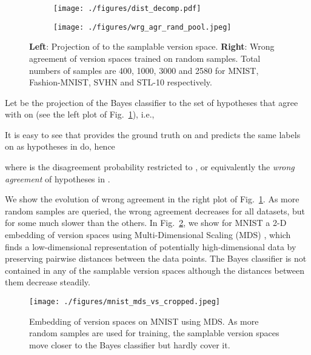 \documentclass[runningheads, envcountsame, a4paper]{llncs}
\newcommand{\ie}{i.e.}
\begin{document}
\begin{figure}[t!]
\begin{subfigure}{0.45\textwidth}
    \center
    \texttt{[image: ./figures/dist\_decomp.pdf]}
\end{subfigure}\begin{subfigure}{0.55\textwidth}
    \centering
    \texttt{[image: ./figures/wrg\_agr\_rand\_pool.jpeg]}
\end{subfigure}
\caption{\textbf{Left}: Projection of  to the samplable version space. \textbf{Right}: Wrong agreement of version spaces trained on random samples. Total numbers of samples are 400, 1000, 3000 and 2580 for MNIST, Fashion-MNIST, SVHN and STL-10 respectively.}
\label{fig:dist_decomp_wrg_agr}
\end{figure}

Let  be the projection of the Bayes classifier  to the set of hypotheses  that agree with  on  (see the left plot of Fig.~\ref{fig:dist_decomp_wrg_agr}), \ie,

It is easy to see that   provides the ground truth on  and predicts the same labels on  as hypotheses in  do, hence 

where  is the disagreement probability restricted to , or equivalently the \textit{wrong agreement} of hypotheses in . 

We show the evolution of wrong agreement in the right plot of Fig.~\ref{fig:dist_decomp_wrg_agr}. As more random samples are queried, the wrong agreement decreases for all datasets, but for some much slower than the others. In Fig.~\ref{fig:mnist_mds_vs}, we show for MNIST a 2-D embedding of version spaces using Multi-Dimensional Scaling (MDS) \cite{Kruskal78}, which finds a low-dimensional representation of potentially high-dimensional data by preserving pairwise distances between the data points. The Bayes classifier is not contained in any of the samplable version spaces although the distances between them decrease steadily. 

\begin{figure}[t!]
\begin{center}
\texttt{[image: ./figures/mnist\_mds\_vs\_cropped.jpeg]}
\end{center}
   \caption{Embedding of version spaces on MNIST using MDS. As more random samples are used for training, the samplable version spaces move closer to the Bayes classifier but hardly cover it.}
\label{fig:mnist_mds_vs}
\end{figure}
\end{document}
